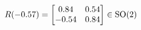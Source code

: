 \documentclass[preview]{standalone}
\begin{document}
\begin{align*}
\special{dvisvgm:raw <g id='unique000'>}R(-0.57) = \begin{bmatrix} 0.84 & 0.54 \\ -0.54 & 0.84 \end{bmatrix} \in \text{SO}(2)\special{dvisvgm:raw </g>}
\end{align*}
\end{document}
